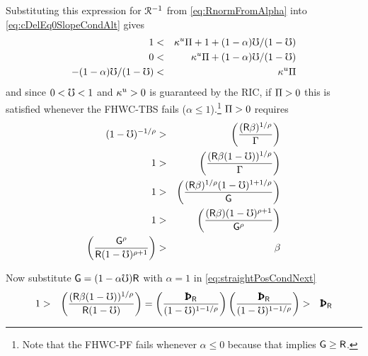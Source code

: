 \message{ !name(TractableBufferStock.tex)}\documentclass{handout}
\begin{document}
Substituting this expression for $\mathcal{R}^{-1}$ from \eqref{eq:RnormFromAlpha} into \eqref{eq:cDelEq0SlopeCondAlt} gives
\begin{eqnarray}
  1 & < & \kappa^{u} \Pi +  1+(1-\alpha)\mho/(1-\mho)
\\ 0 & < & \kappa^{u} \Pi + (1-\alpha)\mho/(1-\mho)
\\ - (1-\alpha)\mho/(1-\mho) & < & \kappa^{u} \Pi \label{eq:alphaReq}
\end{eqnarray}
and since $0 < \mho < 1$ and $\kappa^{u}>0$ is guaranteed by the RIC, if $\Pi>0$ this is satisfied whenever the FHWC-TBS fails ($\alpha \leq 1$).\footnote{Note that the FHWC-PF fails whenever $\alpha \leq 0$ because that implies $\mathsf{G} \geq \mathsf{R}$.}  $\Pi>0$ requires
\begin{eqnarray}
    (1-\mho)^{-1/\rho} & > & \left(\frac{(\mathsf{R} \beta)^{1/\rho}}{\Gamma}\right) \label{eq:straightPosCond}
\\  1 & > & \left(\frac{(\mathsf{R} \beta(1-\mho))^{1/\rho}}{\Gamma}\right)\label{eq:straightPosCondNext}
\\  1 & > & \left(\frac{(\mathsf{R} \beta)^{1/\rho}(1-\mho)^{1+1/\rho}}{\mathsf{G}}\right) \label{eq:straightPosCondAlt}
\\  1 & > & \left(\frac{(\mathsf{R} \beta)(1-\mho)^{\rho+1}}{\mathsf{G}^{\rho}}\right)
 \\  \left(\frac{\mathsf{G}^{\rho}}{\mathsf{R}(1-\mho)^{\rho+1}}\right) & > & \beta \label{eq:DiscountMax}
\end{eqnarray}

Now substitute $\mathsf{G} = (1-\alpha \mho)\mathsf{R}$ with $\alpha=1$ in \eqref{eq:straightPosCondNext} 
\begin{eqnarray}
  1 & > & \left(\frac{(\Rfree \Discount(1-\urate))^{1/\CRRA}}{\Rfree (1-\urate)}\right) = \left(\frac{\PatR }{(1-\urate)^{1-1/\CRRA}}\right) %
\left(\frac{\PatR }{(1-\urate)^{1-1/\CRRA}}\right) & > & \PatR 
\end{eqnarray}



\end{document}

